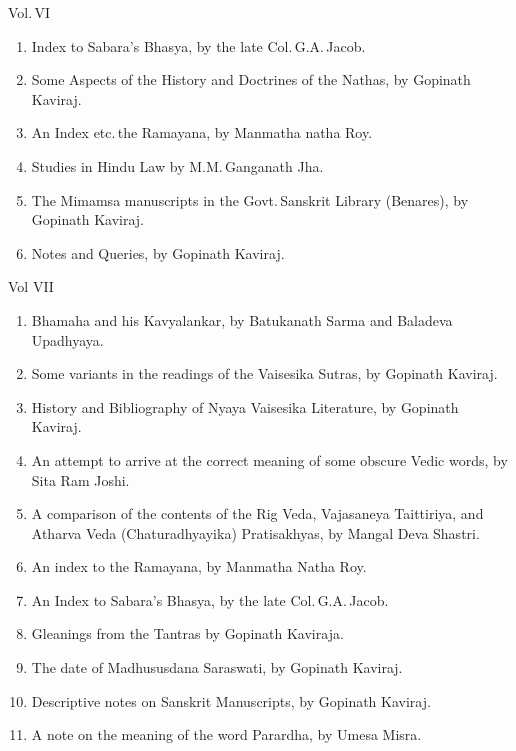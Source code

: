 \documentclass[11pt, openany]{book}
\begin{document}
\newpage

\begin{sloppypar}
\noindent Vol.\,VI \textendash 
\vspace{-2mm}

\begin{enumerate}[\indent(a)]
\setlength{\itemsep}{0pt}
\setlength{\parskip}{0pt}
\item Index to Sabara's Bhasya, by the late Col.\,G.A.\,Jacob.
\item Some Aspects of the History and Doctrines of the Nathas, by Gopinath Kaviraj.
\item An Index etc.\,the Ramayana, by Manmatha natha Roy.
\item Studies in Hindu Law by M.M.\,Ganganath Jha.
\item The Mimamsa manuscripts in the Govt.\,Sanskrit Library (Benares), by Gopinath Kaviraj.
\item Notes and Queries, by Gopinath Kaviraj.
\end{enumerate}

\noindent Vol VII\textendash 
\vspace{-2mm}

\begin{enumerate}[\indent(a)]
\setlength{\itemsep}{0pt}
\setlength{\parskip}{0pt}
\item Bhamaha and his Kavyalankar, by Batukanath Sarma and Baladeva Upadhyaya.
\item Some variants in the readings of the Vaisesika Sutras, by Gopinath Kaviraj.
\item History and Bibliography of Nyaya Vaisesika Literature, by Gopinath Kaviraj.
\item An attempt to arrive at the correct meaning of some obscure Vedic words, by Sita Ram Joshi.
\item A comparison of the contents of the Rig Veda, Vajasaneya Taittiriya, and Atharva Veda (Chaturadhyayika) Pratisakhyas, by Mangal Deva Shastri.
\item An index to the Ramayana, by Manmatha Natha Roy.
\item An Index to Sabara's Bhasya, by the late Col.\,G.A.\,Jacob.
\item Gleanings from the Tantras by Gopinath Kaviraja.
\item The date of Madhususdana Saraswati, by Gopinath Kaviraj.
\item Descriptive notes on Sanskrit Manuscripts, by Gopinath Kaviraj.
\item A note on the meaning of the word Parardha, by Umesa Misra. 
\end{enumerate}
\vspace{-4mm}


\end{sloppypar}
\end{document}
